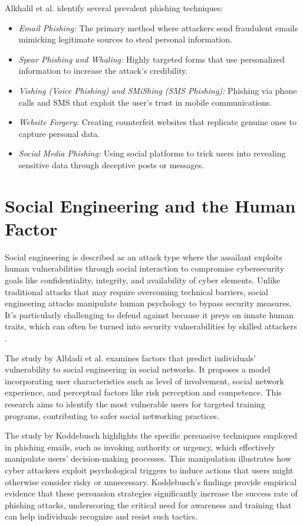 \documentclass[
  a4paper,  %
  twoside,  %
  bibliography=totoc,
  headsepline,
  cleardoublepage=empty,
  parskip=half,
  draft=false
]{scrbook}
\begin{document}
Alkhalil et al. identify several prevalent phishing techniques:
\begin{itemize}
    \item \textit{Email Phishing:} The primary method where attackers send fraudulent emails mimicking legitimate sources to steal personal information.
    \item \textit{Spear Phishing and Whaling:} Highly targeted forms that use personalized information to increase the attack's credibility.
    \item \textit{Vishing (Voice Phishing) and SMiShing (SMS Phishing):} Phishing via phone calls and SMS that exploit the user's trust in mobile communications.
    \item \textit{Website Forgery:} Creating counterfeit websites that replicate genuine ones to capture personal data.
    \item \textit{Social Media Phishing:} Using social platforms to trick users into revealing sensitive data through deceptive posts or messages.
\end{itemize}


\section{Social Engineering and the Human Factor}
Social engineering is described as an attack type where the assailant exploits human vulnerabilities through social interaction to compromise cybersecurity goals like confidentiality, integrity, and availability of cyber elements. Unlike traditional attacks that may require overcoming technical barriers, social engineering attacks manipulate human psychology to bypass security measures. It's particularly challenging to defend against because it preys on innate human traits, which can often be turned into security vulnerabilities by skilled attackers \cite{Wang2021}.

The study by Albladi et al. \cite{albladi} examines factors that predict individuals' vulnerability to social engineering in social networks. It proposes a model incorporating user characteristics such as level of involvement, social network experience, and perceptual factors like risk perception and competence. This research aims to identify the most vulnerable users for targeted training programs, contributing to safer social networking practices.

The study by Koddebusch \cite{koddebusch} highlights the specific persuasive techniques employed in phishing emails, such as invoking authority or urgency, which effectively manipulate users' decision-making processes. This manipulation illustrates how cyber attackers exploit psychological triggers to induce actions that users might otherwise consider risky or unnecessary. Koddebusch's findings provide empirical evidence that these persuasion strategies significantly increase the success rate of phishing attacks, underscoring the critical need for awareness and training that can help individuals recognize and resist such tactics.
\end{document}
